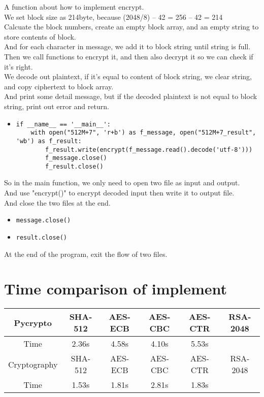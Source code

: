 \documentclass{article}
\begin{document}
\noindent A function about how to implement encrypt.\\
We set block size as 214byte, because (2048/8) – 42 = 256 – 42 = 214\\
Calcuate the block numbers, create an empty block array, and an empty string to store contents of block.\\
And for each character in message, we add it to block string until string is full.\\
Then we call functions to encrypt it, and then also decrypt it so we can check if it's right.\\
We decode out plaintext, if it's equal to content of block string, we clear string, and copy ciphertext to block array.\\
And print some detail message, but if the decoded plaintext is not equal to block string, print out error and return.\\

\begin{itemize}
\item \begin{verbatim}if __name__ == '__main__':
    with open("512M+7", 'r+b') as f_message, open("512M+7_result", 'wb') as f_result:
        f_result.write(encrypt(f_message.read().decode('utf-8')))
        f_message.close()
        f_result.close()
\end{verbatim}
\end{itemize}

\noindent So in the main function, we only need to open two file as input and output.\\
And use "encrypt()" to encrypt decoded input then write it to output file.\\
And close the two files at the end.

\begin{itemize}
\item \verb|message.close()|
\item \verb|result.close()|
\end{itemize}

\noindent At the end of the program, exit the flow of two files.\\

\section{Time comparison of implement}

\begin{tabular}[c]{|c||c|c|c|c|c|}
\hline
Pycrypto & SHA-512 & AES-ECB & AES-CBC & AES-CTR & RSA-2048 \\
\hline
Time & 2.36s & 4.58s & 4.10s & 5.53s &  \\
\hline
Cryptography & SHA-512 & AES-ECB & AES-CBC & AES-CTR & RSA-2048 \\
\hline
Time & 1.53s & 1.81s & 2.81s & 1.83s &  \\
\hline
\end{tabular}
\end{document}
